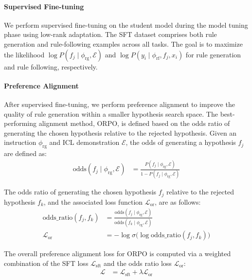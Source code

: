 \paragraph{Supervised Fine-tuning} We perform supervised fine-tuning on the student model during the model tuning phase using low-rank adaptation. The SFT dataset comprises both rule generation and rule-following examples across all tasks. The goal is to maximize the likelihood $\log P(f_j \mid \phi_{\mathrm{rg}}, \mathcal{E})$ and $\log P(y_i \mid \phi_{\mathrm{rf}}, f_j, x_i)$ for rule generation and rule following, respectively.

\paragraph{Preference Alignment} 
After supervised fine-tuning, we perform preference alignment to improve the quality of rule generation within a smaller hypothesis search space. The best-performing alignment method, ORPO, is defined based on the odds ratio of generating the chosen hypothesis relative to the rejected hypothesis. Given an instruction $\phi_{\mathrm{rg}}$ and ICL demonstration $\mathcal{E}$, the odds of generating a hypothesis $f_j$ are defined as:
\begin{align*}
    \mathrm{odds}(f_j \mid \phi_{\mathrm{rg}}, \mathcal{E}) 
    &= \frac{P(f_j \mid \phi_{\mathrm{rg}}, \mathcal{E})}{1 - P(f_j \mid \phi_{\mathrm{rg}}, \mathcal{E})}
\end{align*}

The odds ratio of generating the chosen hypothesis $f_j$ relative to the rejected hypothesis $f_k$, and the associated loss function $\mathcal{L}_{\mathrm{or}}$, are as follows:
\begin{align*}
    \mathrm{odds\_ratio}(f_j, f_k) 
    &= \frac{\mathrm{odds}(f_j \mid \phi_{\mathrm{rg}}, \mathcal{E})}{\mathrm{odds}(f_k \mid \phi_{\mathrm{rg}}, \mathcal{E})} \\
    \mathcal{L}_{\mathrm{or}} 
    &= -\log \sigma\big( \log \mathrm{odds\_ratio}(f_j, f_k) \big)
\end{align*}

The overall preference alignment loss for ORPO is computed via a weighted combination of the SFT loss $\mathcal{L}_{\mathrm{sft}}$ and the odds ratio loss $\mathcal{L}_{\mathrm{or}}$:
\begin{align*}
    \mathcal{L} 
    &= \mathcal{L}_{\mathrm{sft}} + \lambda \mathcal{L}_{\mathrm{or}}
\end{align*}


